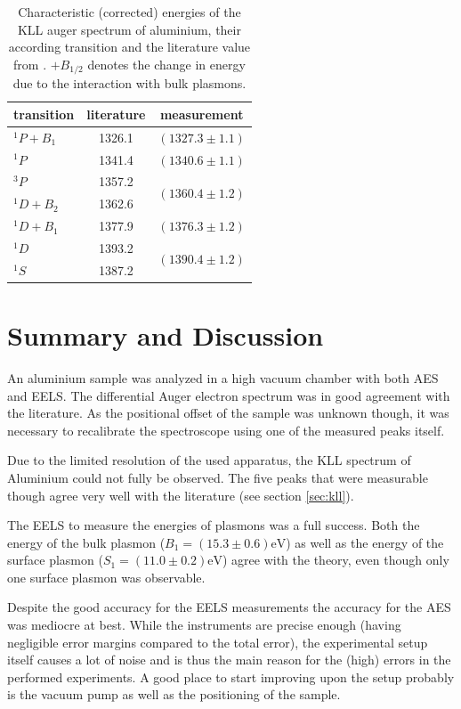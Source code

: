 \documentclass[a4paper]{scrartcl}
\numberwithin{equation}{section}
\numberwithin{figure}{section}
\numberwithin{table}{section}
\begin{document}
\begin{table}[!h]
\centering
\begin{tabular}{lcc}
\toprule
transition & literature & measurement \\
\midrule
$^1P + B_1$ & 1326.1 & $(1327.3\pm 1.1)$  \\
\midrule
$^1P$ 		& 1341.4 & $(1340.6\pm 1.1)$ \\
\midrule
$^3P$ 		& 1357.2 & \multirow{2}{*}{$(1360.4\pm 1.2)$}  \\
$^1D + B_2$ & 1362.6 & \\
\midrule
$^1D + B_1$ & 1377.9 & $(1376.3\pm 1.2)$ \\
\midrule
$^1D$ 		& 1393.2 & \multirow{2}{*}{$(1390.4\pm 1.2)$}  \\
$^1S$ 	   & 1387.2 & \\
 \bottomrule
\end{tabular}

\caption{\small Characteristic (corrected) energies of the KLL auger spectrum of aluminium, their according transition and the literature value from \cite{paper}. $+B_{1/2}$ denotes the change in energy due to the interaction with bulk plasmons. }

\label{A}
\end{table}


\FloatBarrier
\section{Summary and Discussion}
An aluminium sample was analyzed in a high vacuum chamber with both AES and EELS. The differential Auger electron spectrum was in good agreement with the literature. As the positional offset of the sample was unknown though, it was necessary to recalibrate the spectroscope using one of the measured peaks itself.

Due to the limited resolution of the used apparatus, the KLL spectrum of Aluminium could not fully be observed. The five peaks that were measurable though agree very well with the literature (see section \ref{sec:kll}).

The EELS to measure the energies of plasmons was a full success. Both the energy of the bulk plasmon ($B_1 = (15.3\pm 0.6)\text{eV}$) as well as the energy of the surface plasmon ($S_1 = (11.0\pm 0.2)\text{eV}$) agree with the theory, even though only one surface plasmon was observable.

Despite the good accuracy for the EELS measurements the accuracy for the AES was mediocre at best. While the instruments are precise enough (having negligible error margins compared to the total error), the experimental setup itself causes a lot of noise and is thus the main reason for the (high) errors in the performed experiments. A good place to start improving upon the setup probably is the vacuum pump as well as the positioning of the sample.

\clearpage 



\end{document}
